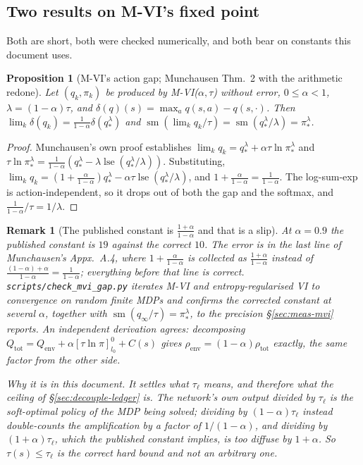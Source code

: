 \documentclass{article}
\DeclareMathOperator{\sm}{sm}
\DeclareMathOperator{\lse}{lse}
\newcommand{\env}{\mathrm{env}}
\newcommand{\tot}{\mathrm{tot}}
\newcommand{\gapop}{\delta}
\newtheorem{proposition}{Proposition}
\newtheorem{remark}{Remark}
\begin{document}
\subsection{Two results on M-VI's fixed point}
\label{sec:kept}

Both are short, both were checked numerically, and both bear on constants this document uses.

\begin{proposition}[M-VI's action gap; Munchausen Thm.~2 with the arithmetic redone]
\label{prop:amp}
Let $(q_k,\pi_k)$ be produced by M-VI($\alpha,\tau$) without error, $0 \le \alpha < 1$,
$\lambda = (1-\alpha)\tau$, and $\gapop(q)(s) = \max_a q(s,a) - q(s,\cdot)$. Then
$\lim_k \gapop(q_k) = \frac{1}{1-\alpha}\gapop(q_*^{\lambda})$ and
$\sm(\lim_k q_k/\tau) = \sm(q_*^{\lambda}/\lambda) = \pi_*^{\lambda}$.
\end{proposition}
\begin{proof}
Munchausen's own proof establishes $\lim_k q_k = q_*^\lambda + \alpha\tau\ln\pi_*^\lambda$ and
$\tau\ln\pi_*^\lambda = \frac{1}{1-\alpha}(q_*^\lambda - \lambda\lse(q_*^\lambda/\lambda))$.
Substituting, $\lim_k q_k = (1 + \frac{\alpha}{1-\alpha})q_*^\lambda -
\alpha\tau\lse(q_*^\lambda/\lambda)$, and $1 + \frac{\alpha}{1-\alpha} = \frac{1}{1-\alpha}$. The
log-sum-exp is action-independent, so it drops out of both the gap and the softmax, and
$\frac{1}{1-\alpha}/\tau = 1/\lambda$.
\end{proof}

\begin{remark}[The published constant is $\frac{1+\alpha}{1-\alpha}$ and that is a slip]
\label{rem:erratum}
At $\alpha = 0.9$ the published constant is $19$ against the correct $10$. The error is in the
last line of Munchausen's Appx.~A.4, where $1 + \frac{\alpha}{1-\alpha}$ is collected as
$\frac{1+\alpha}{1-\alpha}$ instead of $\frac{(1-\alpha)+\alpha}{1-\alpha} = \frac{1}{1-\alpha}$;
everything before that line is correct. \texttt{scripts/check\_mvi\_gap.py} iterates M-VI and
entropy-regularised VI to convergence on random finite MDPs and confirms the corrected constant
at several $\alpha$, together with $\sm(q_\infty/\tau) = \pi_*^\lambda$, to the precision
\S\ref{sec:meas-mvi} reports. An independent derivation agrees: decomposing
$Q_\tot = Q_\env + \alpha[\tau\ln\pi]_{l_0}^{0} + C(s)$ gives $\rho_\env = (1-\alpha)\rho_\tot$
exactly, the same factor from the other side.

\emph{Why it is in this document.} It settles what $\tau_\ell$ means, and therefore what the
ceiling of \S\ref{sec:decouple-ledger} is. The network's own output divided by $\tau_\ell$ is the
soft-optimal policy of the MDP being solved; dividing by $(1-\alpha)\tau_\ell$ instead
double-counts the amplification by a factor of $1/(1-\alpha)$, and dividing by
$(1+\alpha)\tau_\ell$, which the published constant implies, is too diffuse by $1+\alpha$. So
$\tau(s) \le \tau_\ell$ is the correct hard bound and not an arbitrary one.
\end{remark}
\end{document}

